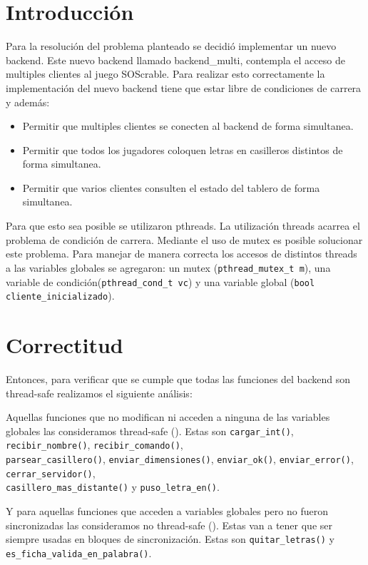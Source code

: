 \section{Introducci\'on}

Para la resoluci\'on del problema planteado se decidi\'o implementar un nuevo backend. Este nuevo backend llamado backend\_multi, contempla el acceso de multiples clientes al juego SOScrable. Para realizar esto correctamente la implementaci\'on del nuevo backend tiene que estar libre de condiciones de carrera y adem\'as:
\begin{itemize}
 \item Permitir que multiples clientes se conecten al backend de forma simultanea.
 \item Permitir que todos los jugadores coloquen letras en casilleros distintos de forma simultanea.
 \item Permitir que varios clientes consulten el estado del tablero de forma simultanea.
\end{itemize}
Para que esto sea posible se utilizaron pthreads. La utilizaci\'on threads acarrea el problema de condici\'on de carrera. Mediante el uso de mutex es posible solucionar este problema. Para manejar de manera correcta los accesos de distintos threads a las variables globales se agregaron: un mutex (\verb|pthread_mutex_t m|), una variable de condici\'on(\verb|pthread_cond_t vc|) y una variable global (\verb|bool cliente_inicializado|).

\section{Correctitud}

Entonces, para verificar que se cumple que todas las funciones del backend son thread-safe realizamos el siguiente an\'alisis:

Aquellas funciones que no modifican ni acceden a ninguna de las variables globales las consideramos thread-safe (\ts). Estas son \verb|cargar_int()|, \verb|recibir_nombre()|, \verb|recibir_comando()|, \\
\verb|parsear_casillero()|, \verb|enviar_dimensiones()|, \verb|enviar_ok()|, \verb|enviar_error()|, \verb|cerrar_servidor()|, \\
\verb|casillero_mas_distante()| y \verb|puso_letra_en()|.

Y para aquellas funciones que acceden a variables globales pero no fueron sincronizadas las consideramos no thread-safe (\nts). Estas van a tener que ser siempre usadas en bloques de sincronizaci\'on. Estas son \verb|quitar_letras()| y \verb|es_ficha_valida_en_palabra()|.

